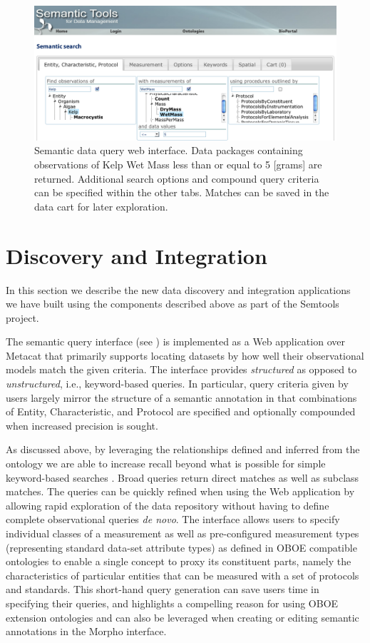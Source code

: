 \begin{figure}[!t]
\centering
\includegraphics[width=1.0\textwidth]{images/metacat-query.png}
\caption{Semantic data query web interface. Data packages containing observations of Kelp Wet Mass less than or equal to 5 [grams] are returned. Additional search options and compound query criteria can be specified within the other tabs. Matches can be saved in the data cart for later exploration.}
\label{fig:metacat-query}
\end{figure}


\section{Discovery and Integration}
\label{sec:application}

In this section we describe the new data discovery and integration
applications we have built using the components described above as
part of the Semtools project.

 The semantic query interface (see
) is implemented as a Web application over
Metacat that primarily supports locating datasets by how well their
observational models match the given criteria. The interface provides
\emph{structured} as opposed to \emph{unstructured}, i.e.,
keyword-based queries. In particular, query criteria given by users
largely mirror the structure of a semantic annotation in that
combinations of Entity, Characteristic, and Protocol are specified and
optionally compounded when increased precision is sought.

As discussed above, by leveraging the relationships defined and
inferred from the ontology we are able to increase recall beyond what
is possible for simple keyword-based searches
\cite{berkley09:_improv_data_discov_for_metad}. Broad queries return
direct matches as well as subclass matches. The queries can be quickly
refined when using the Web application by allowing rapid exploration
of the data repository without having to define complete observational
queries \emph{de novo}. The interface allows users to specify
individual classes of a measurement as well as pre-configured
measurement types (representing standard data-set attribute types) as
defined in OBOE compatible ontologies to enable a single concept to
proxy its constituent parts, namely the characteristics of particular
entities that can be measured with a set of protocols and
standards. This short-hand query generation can save users time in
specifying their queries, and highlights a compelling reason for using
OBOE extension ontologies and can also be leveraged when creating or
editing semantic annotations in the Morpho interface.

